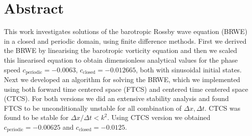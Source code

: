 \section*{Abstract}
This work investigates solutions of the barotropic Rossby wave equation (BRWE)
in a closed and periodic domain, using finite difference methods. First we
derived the BRWE  by linearising the barotropic vorticity equation and
then we scaled this linearised equation to obtain dimensionless analytical
values for the phase speed $c_{\mathrm{periodic}} = -0.0063$,
$c_{\mathrm{closed}} = -0.012665$, both with sinusoidal initial states. 
Next we developed an algorithm for solving the BRWE, which we implemented using
both forward time centered space (FTCS) and centered time centered space (CTCS).
For both versions we did an extensive stability analysis and found FTCS to be
unconditionally unstable for all combination of $\Delta x, \Delta t$. CTCS was
found to be stable for $\Delta x / \Delta t < k^2$. Using CTCS version we
obtained $c_{\mathrm{periodic}}= - 0.00625$ and $c_{\mathrm{closed}} = -
0.0125$.  
